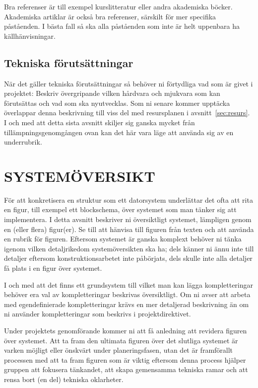 \documentclass[a4paper]{article}
\begin{document}
Bra referenser är till exempel kurslitteratur eller andra akademiska
böcker. Akademiska artiklar är också bra referenser, särskilt för mer
specifika påståenden. I bästa fall så ska alla påståenden som inte är
helt uppenbara ha källhänvisningar.


\subsection{Tekniska förutsättningar}
\label{sec:tekniskaf}

När det gäller tekniska förutsättningar så behöver ni förtydliga vad som
är givet i projektet: Beskriv övergripande vilken hårdvara och mjukvara
som kan förutsättas och vad som ska nyutvecklas. Som ni senare kommer
upptäcka överlappar denna beskrivning till viss del med resursplanen i
avsnitt~\ref{sec:resurs}. I och med att detta sista avsnitt skiljer sig
ganska mycket från tillämpningsgenomgången ovan kan det här vara läge
att använda sig av en underrubrik.



\section{SYSTEMÖVERSIKT}
\label{sec:systemö}


För att konkretisera en struktur som ett datorsystem underlättar det
ofta att rita en figur, till exempel ett blockschema, över systemet som
man tänker sig att implementera. I detta avsnitt beskriver ni
översiktligt systemet, lämpligen genom en (eller flera) figur(er). Se
till att hänvisa till figuren från texten och att använda en rubrik för
figuren. Eftersom systemet är ganska komplext behöver ni tänka igenom
vilken detaljrikedom systemöversikten ska ha; dels känner ni ännu inte
till detaljer eftersom konstruktionsarbetet inte påbörjats, dels skulle
inte alla detaljer få plats i en figur över systemet.

I och med att det finns ett grundsystem till vilket man kan lägga
kompletteringar behöver era val av kompletteringar beskrivas
översiktligt. Om ni avser att arbeta med egendefinierade kompletteringar
krävs en mer detaljerad beskrivning än om ni använder kompletteringar
som beskrivs i projektdirektivet.

Under projektets genomförande kommer ni att få anledning att revidera
figuren över systemet. Att ta fram den ultimata figuren över det
slutliga systemet är varken möjligt eller önskvärt under
planeringsfasen, utan det är framförallt processen med att ta fram
figuren som är viktig eftersom denna process hjälper gruppen att
fokusera tänkandet, att skapa gemensamma tekniska ramar och att rensa
bort (en del) tekniska oklarheter.
\end{document}
